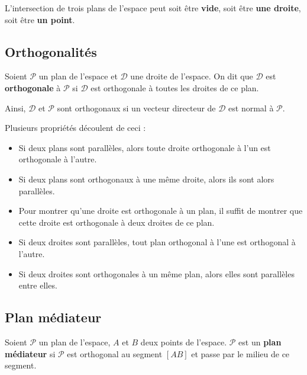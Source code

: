 	\begin{tip}
		L'intersection de trois plans de l'espace peut soit être \textbf{vide}, soit être \textbf{une droite}, soit être \textbf{un point}.
	\end{tip}

	\subsection{Orthogonalités}

	\begin{formula}[Définition]
		Soient $\mathcal{P}$ un plan de l'espace et $\mathcal{D}$ une droite de l'espace. On dit que $\mathcal{D}$ est \textbf{orthogonale} à $\mathcal{P}$ si $\mathcal{D}$ est orthogonale à toutes les droites de ce plan.
	\end{formula}

	\begin{tip}
		Ainsi, $\mathcal{D}$ et $\mathcal{P}$ sont orthogonaux si un vecteur directeur de $\mathcal{D}$ est normal à $\mathcal{P}$.
	\end{tip}

	\begin{tip}[Propriétés]
		Plusieurs propriétés découlent de ceci :
		\begin{itemize}
			\item Si deux plans sont parallèles, alors toute droite orthogonale à l'un est orthogonale à l'autre.
			\item Si deux plans sont orthogonaux à une même droite, alors ils sont alors parallèles.
			\item Pour montrer qu'une droite est orthogonale à un plan, il suffit de montrer que cette droite est orthogonale à deux droites de ce plan.
			\item Si deux droites sont parallèles, tout plan orthogonal à l'une est orthogonal à l'autre.
			\item Si deux droites sont orthogonales à un même plan, alors elles sont parallèles entre elles.
		\end{itemize}
	\end{tip}

	\subsection{Plan médiateur}

	\begin{formula}[Définition]
		Soient $\mathcal{P}$ un plan de l'espace, $A$ et $B$ deux points de l'espace.
		\newpar
		$\mathcal{P}$ est un \textbf{plan médiateur} si $\mathcal{P}$ est orthogonal au segment $[AB]$ et passe par le milieu de ce segment.
	\end{formula}

